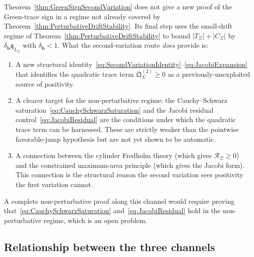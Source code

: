 \begin{remark}\label{rem:SecondVariationHonest}
Theorem~\ref{thm:GreenSignSecondVariation} does not give a new proof of the Green-trace sign in a regime not already covered by Theorem~\ref{thm:PerturbativeDriftStability}. Its final step uses the small-drift regime of Theorem~\ref{thm:PerturbativeDriftStability} to bound $|T_\Sigma|+|C_\Sigma|$ by $\delta_{\mathbf b}\mathfrak q_{L_\Sigma}$ with $\delta_{\mathbf b}<1$. What the second-variation route \emph{does} provide is:
\begin{enumerate}
    \item A new structural identity~\eqref{eq:SecondVariationIdentity}--\eqref{eq:JacobiExpansion} that identifies the quadratic trace term $\mathfrak Q_\Sigma^{(2)}\ge0$ as a previously-unexploited source of positivity.
    \item A clearer target for the non-perturbative regime: the Cauchy--Schwarz saturation~\eqref{eq:CauchySchwarzSaturation} and the Jacobi residual control~\eqref{eq:JacobiResidual} are the conditions under which the quadratic trace term can be harnessed. These are strictly weaker than the pointwise favorable-jump hypothesis but are not yet shown to be automatic.
    \item A connection between the cylinder Fredholm theory (which gives $\mathcal R_\Sigma\ge0$) and the constrained maximum-area principle (which gives the Jacobi form). This connection is the structural reason the second variation sees positivity the first variation cannot.
\end{enumerate}
A complete non-perturbative proof along this channel would require proving that~\eqref{eq:CauchySchwarzSaturation} and~\eqref{eq:JacobiResidual} hold in the non-perturbative regime, which is an open problem.
\end{remark}

\subsection{Relationship between the three channels}

